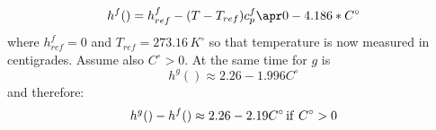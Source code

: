 \begin{equation}
h^f() = h^f_{ref} -(T-T_{ref})c_p^f \apr 0 - 4.186*  C^\circ   
\end{equation}
where \(h_{ref}^f=0\) and \(T_{ref} = 273.16\, K^\circ\) so that temperature is now measured in centigrades. Assume also \(C^\circ >0 \).
At the same time for \(g\) is 
\begin{equation}
h^g( ) \approx 2.26  - 1.996 C^\circ
\end{equation}
and therefore:
\begin{equation}
h^g()-h^f() \approx 2.26 - 2.19 C^\circ \, {\rm if}\ C^\circ > 0
\end{equation}